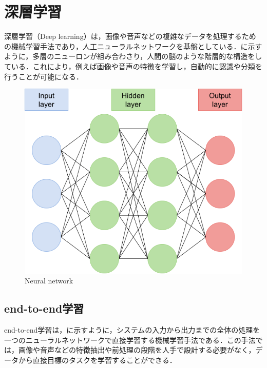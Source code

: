 
\section{深層学習}

  深層学習（Deep learning）は，画像や音声などの複雑なデータを処理するための機械学習手法であり，人工ニューラルネットワークを基盤としている．に示すように，多層のニューロンが組み合わさり，人間の脳のような階層的な構造をしている．これにより，例えば画像や音声の特徴を学習し，自動的に認識や分類を行うことが可能になる．

  \begin{figure}[h]
    \centering
    \includegraphics[keepaspectratio, scale=0.30] {images/deep_neural_network.png}
    \caption{Neural network}
    \label{Fig:deep_neural_network}
  \end{figure}

\newpage

\subsection{end-to-end学習}

  end-to-end学習は，に示すように，システムの入力から出力までの全体の処理を一つのニューラルネットワークで直接学習する機械学習手法である．この手法では，画像や音声などの特徴抽出や前処理の段階を人手で設計する必要がなく，データから直接目標のタスクを学習することができる．

